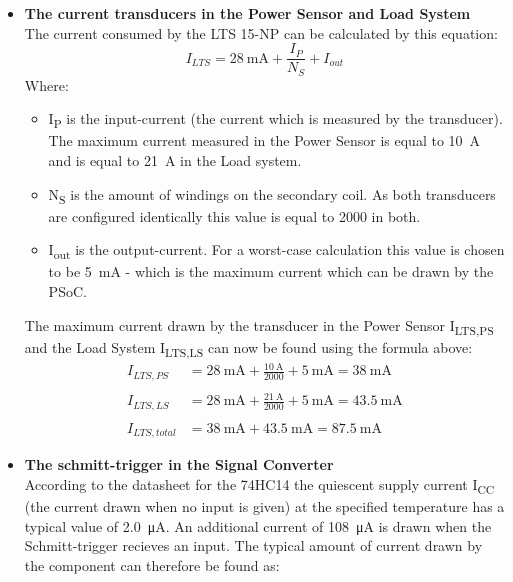 \begin{itemize}
	\item \textbf{The current transducers in the Power Sensor and Load System}\\
	The current consumed by the LTS 15-NP can be calculated by this equation\cite{CurrentTransducer}:
	\begin{equation}
		I_{LTS} = \SI{28}{\milli \ampere} + \frac{I_P}{N_S} + I_{out}
	\end{equation}
	Where:
	\begin{itemize}
		\item I\textsubscript{P} is the input-current (the current which is measured by the transducer). The maximum current measured in the Power Sensor is equal to \SI{10}{\ampere} and is equal to \SI{21}{\ampere} in the Load system.
		\item N\textsubscript{S} is the amount of windings on the secondary coil. As both transducers are configured identically this value is equal to 2000 in both.
		\item I\textsubscript{out} is the output-current. For a worst-case calculation this value is chosen to be \SI{5}{\milli \ampere} - which is the maximum current which can be drawn by the PSoC.
	\end{itemize}
	The maximum current drawn by the transducer in the Power Sensor I\textsubscript{LTS,PS} and the Load System I\textsubscript{LTS,LS} can now be found using the formula above:
	\begin{equation}
	\begin{split}
	I_{LTS,PS} &= \SI{28}{\milli \ampere} + \frac{\SI{10}{\ampere}}{2000} + \SI{5}{\milli \ampere} = \SI{38}{\milli \ampere}\\
	\\
	I_{LTS,LS} &= \SI{28}{\milli \ampere} + \frac{\SI{21}{\ampere}}{2000} + \SI{5}{\milli \ampere} = \SI{43.5}{\milli \ampere}\\
	\\
	I_{LTS,total} &= \SI{38}{\milli \ampere} + \SI{43.5}{\milli \ampere} = \SI{87.5}{\milli \ampere}
	\end{split}
	\end{equation}
	\item \textbf{The schmitt-trigger in the Signal Converter}\\
	According to the datasheet for the 74HC14\cite{74HC14} the quiescent supply current I\textsubscript{CC} (the current drawn when no input is given) at the specified temperature has a typical value of \SI{2.0}{\micro \ampere}. An additional current of \SI{108}{\micro \ampere} is drawn when the Schmitt-trigger recieves an input. The typical amount of current drawn by the component can therefore be found as:

\end{itemize}
